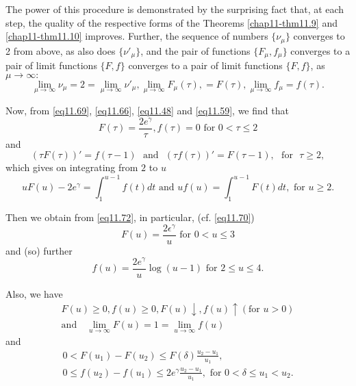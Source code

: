 The power of this procedure is demonstrated by the surprising fact
that, at each step, the quality of the respective forms of the
Theorems \ref{chap11-thm11.9}  and \ref{chap11-thm11.10}
improves. Further, the sequence of 
numbers $\{ \nu_\mu\}$  converges to 2 from above, as also does
$\{\nu'_ \mu\}$, and the pair of functions $\{F_\mu , f_\mu\}$
converges to a pair of limit functions $\{ F,f\}$ converges to a pair
of limit functions $\{ F,f\}$, as $\mu \rightarrow \infty:$ 
 \begin{equation*}
\lim\limits_{\mu \to \infty} \nu_\mu =2 = \lim\limits_{\mu \to \infty}
\nu ' _\mu , \lim\limits_{\mu \to \infty} F_\mu (\tau), = F (\tau),
\lim\limits_{\mu \to \infty}f_\mu =f(\tau). \tag{11.69}\label{eq11.69} 
 \end{equation*} 
 
Now, from \eqref{eq11.69}, \eqref{eq11.66}, \eqref{eq11.48} and
\eqref{eq11.59}, we find that 
  \begin{equation*}
F(\tau ) = \frac{2e ^\gamma}{\tau}, f (\tau)= 0 \text{ for } 0< \tau
\leq 2 \tag{11.70}\label{eq11.70} 
 \end{equation*} 
and 
\begin{equation*}
(\tau F(\tau )) ' = f(\tau -1) \text{~ and~ } (\tau f(\tau )) ' =  F(\tau
  -1), \text{~ for~ } \tau \ge 2, \tag{11.71}\label{eq11.71} 
 \end{equation*} 
 which gives on integrating from $2$ to $u$ 
\begin{equation*}
u F (u) -2 e^\gamma = \int ^{u-1}_1 f(t) dt \text{ and } uf (u)  =\int
_1^{u-1} F(t)dt, \text{ for } u \ge 2.\tag{11.72}\label{eq11.72} 
 \end{equation*} 
 
Then we obtain from \eqref{eq11.72}, in particular, (cf. \eqref{eq11.70})
\begin{equation*}
F(u)= \frac{2 \epsilon^\gamma}{u} \text{ for } 0<u \leq	  3
\tag{11.73}\label{eq11.73} 
\end{equation*} 
and (so) further 
\begin{equation*}
f(u) = \frac{2e^\gamma}{u} \log (u-1) \text{ for } 2 \leq u \leq
4.\tag{11.74}\label{eq11.74} 
\end{equation*} 

Also, we have
\begin{gather*}
F(u)\ge 0, f(u) \ge 0, F(u) \downarrow , f(u) \uparrow (\text{for } u> 0)\\
\text{and}\quad \lim\limits_{u \to \infty} F(u)= 1 = \lim\limits_{u \to
  \infty} f(u) \tag{11.75}\label{eq11.75} 
\end{gather*} 
and 
\begin{gather*}
0<  F(u_1) -F(u_2) \leq F(\delta) \frac{u_2- u_1}{u_1} ,\\ 0 \leq
f(u_2)-f(u_1)\leq 2e ^\gamma \frac {u_2- u_1}{u_1}, \text{ for } 0<
\delta \leq u_1 < u_2. \tag{11.76}\label{eq11.76} 
\end{gather*}
 
